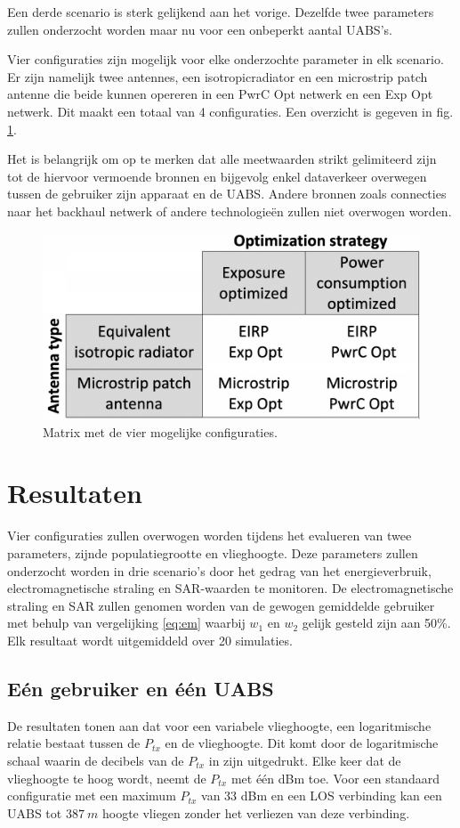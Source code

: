 \documentclass[twocolumn]{phdsymp_dutch}
\begin{document}
Een derde scenario is sterk gelijkend aan het vorige. Dezelfde twee parameters zullen onderzocht 
worden maar nu voor een onbeperkt aantal \gls{UABS}'s.

Vier configuraties zijn mogelijk voor elke onderzochte parameter in elk scenario.
Er zijn namelijk twee antennes, een \gls{isotropicradiator} en een microstrip patch antenne die
beide kunnen opereren in een \gls{PwrC Opt} netwerk en een \gls{Exp Opt} netwerk. Dit maakt een totaal van 4 configuraties.
Een overzicht is gegeven in fig. \ref{fig:fourCasesMatrix}.

Het is belangrijk om op te merken dat alle meetwaarden strikt gelimiteerd zijn tot de hiervoor vermoende bronnen en 
bijgevolg enkel dataverkeer overwegen tussen de gebruiker zijn apparaat en de \gls{UABS}. 
Andere bronnen zoals connecties naar het backhaul netwerk of andere technologie\"en zullen niet overwogen worden.

\begin{figure}[h!]
\centering
  \includegraphics[width=0.6\linewidth]{fourCasesMatrix.png}
  \caption{Matrix met de vier mogelijke configuraties.}
  \label{fig:fourCasesMatrix}
\end{figure}

\section{Resultaten}
Vier configuraties zullen overwogen worden tijdens het evalueren van twee parameters, zijnde 
populatiegrootte en vlieghoogte. Deze parameters zullen onderzocht worden in drie scenario's 
door het gedrag van het energieverbruik, electromagnetische straling en \gls{SAR}-waarden te monitoren.
De electromagnetische straling en \gls{SAR} zullen genomen worden van de gewogen gemiddelde gebruiker
met behulp van vergelijking \ref{eq:em} waarbij $w_{1}$ en $w_{2}$ gelijk gesteld zijn aan 50\%. 
Elk resultaat wordt uitgemiddeld over 20 simulaties.


\subsection{E\'en gebruiker en \'e\'en \gls{UABS}}
De resultaten tonen aan dat voor een variabele vlieghoogte, een logaritmische relatie bestaat tussen de 
 $P_{tx}$ en de vlieghoogte.
 Dit komt door de logaritmische schaal waarin de decibels van de $P_{tx}$ in zijn uitgedrukt.
Elke keer dat de vlieghoogte te hoog wordt, neemt de $P_{tx}$ met \'e\'en dBm toe.
Voor een standaard configuratie met een maximum $P_{tx}$ van 33 dBm en een \gls{LOS} verbinding kan een 
\gls{UABS} tot $387\ m$ hoogte vliegen zonder het verliezen van deze verbinding.
\end{document}
